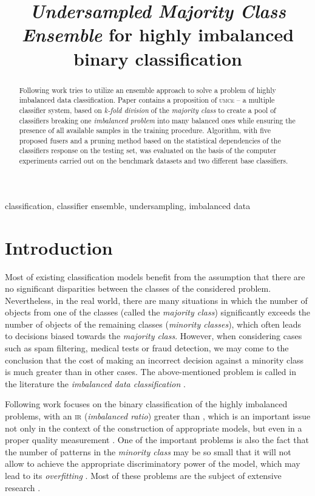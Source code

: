 \documentclass[pmlr]{jmlr}
\title
[Undersampled Majority Class Ensemble]
{
	\emph{Undersampled Majority Class Ensemble} for highly imbalanced binary classification%
}
\begin{document}
\maketitle

\begin{abstract}
Following work tries to utilize an ensemble approach to solve a problem of highly imbalanced data classification. Paper contains a proposition of \textsc{umce} -- a multiple classifier system, based on \emph{k-fold division} of the \emph{majority class} to create a pool of classifiers breaking one \emph{imbalanced problem} into many balanced ones while ensuring the presence of all available samples in the training procedure. Algorithm, with five proposed fusers and a pruning method based on the statistical dependencies of the classifiers response on the testing set, was evaluated on the basis of the computer experiments carried out on the benchmark datasets and two different base classifiers.
\end{abstract}
\begin{keywords}
classification, classifier ensemble, undersampling, imbalanced data
\end{keywords}

\section{Introduction}
\label{sec:intro}

Most of existing classification models benefit from the assumption that there are no significant disparities between the classes of the considered problem. Nevertheless, in the real world, there are many situations in which the number of objects from one of the classes (called the \emph{majority class}) significantly exceeds the number of objects of the remaining classes (\emph{minority classes}), which often leads to decisions biased towards the \emph{majority class}. However, when considering cases such as spam filtering, medical tests or fraud detection, we may come to the conclusion that the cost of making an incorrect decision against a minority class is much greater than in other cases. The above-mentioned problem is called in the literature the \emph{imbalanced data classification} \citep{Wang:2017,Sun:2009}.

Following work focuses on the binary classification of the highly imbalanced problems, with an \textsc{ir} (\emph{imbalanced ratio}) greater than , which is an important issue not only in the context of the construction of appropriate models, but even in a proper quality measurement \citep{Elazmeh:2006}. One of the important problems is also the fact that the number of patterns in the \emph{minority class} may be so small that it will not allow to achieve the appropriate discriminatory power of the model, which may lead to its \emph{overfitting} \citep{Chen:2008}. Most of these problems are the subject of extensive research \citep{Bunkhumpornpat:2009,Chawla:2002}.
\end{document}
